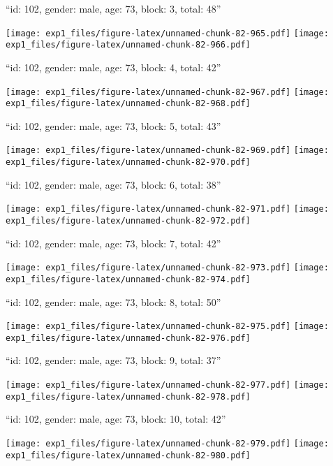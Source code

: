\documentclass[11pt,,]{article}
\begin{document}
\newpage
[1] 

``id: 102, gender: male, age: 73, block: 3, total: 48''

\texttt{[image: exp1\_files/figure-latex/unnamed-chunk-82-965.pdf]}
\texttt{[image: exp1\_files/figure-latex/unnamed-chunk-82-966.pdf]}

\newpage
[1] 

``id: 102, gender: male, age: 73, block: 4, total: 42''

\texttt{[image: exp1\_files/figure-latex/unnamed-chunk-82-967.pdf]}
\texttt{[image: exp1\_files/figure-latex/unnamed-chunk-82-968.pdf]}

\newpage
[1] 

``id: 102, gender: male, age: 73, block: 5, total: 43''

\texttt{[image: exp1\_files/figure-latex/unnamed-chunk-82-969.pdf]}
\texttt{[image: exp1\_files/figure-latex/unnamed-chunk-82-970.pdf]}

\newpage
[1] 

``id: 102, gender: male, age: 73, block: 6, total: 38''

\texttt{[image: exp1\_files/figure-latex/unnamed-chunk-82-971.pdf]}
\texttt{[image: exp1\_files/figure-latex/unnamed-chunk-82-972.pdf]}

\newpage
[1] 

``id: 102, gender: male, age: 73, block: 7, total: 42''

\texttt{[image: exp1\_files/figure-latex/unnamed-chunk-82-973.pdf]}
\texttt{[image: exp1\_files/figure-latex/unnamed-chunk-82-974.pdf]}

\newpage
[1] 

``id: 102, gender: male, age: 73, block: 8, total: 50''

\texttt{[image: exp1\_files/figure-latex/unnamed-chunk-82-975.pdf]}
\texttt{[image: exp1\_files/figure-latex/unnamed-chunk-82-976.pdf]}

\newpage
[1] 

``id: 102, gender: male, age: 73, block: 9, total: 37''

\texttt{[image: exp1\_files/figure-latex/unnamed-chunk-82-977.pdf]}
\texttt{[image: exp1\_files/figure-latex/unnamed-chunk-82-978.pdf]}

\newpage
[1] 

``id: 102, gender: male, age: 73, block: 10, total: 42''

\texttt{[image: exp1\_files/figure-latex/unnamed-chunk-82-979.pdf]}
\texttt{[image: exp1\_files/figure-latex/unnamed-chunk-82-980.pdf]}
\end{document}
